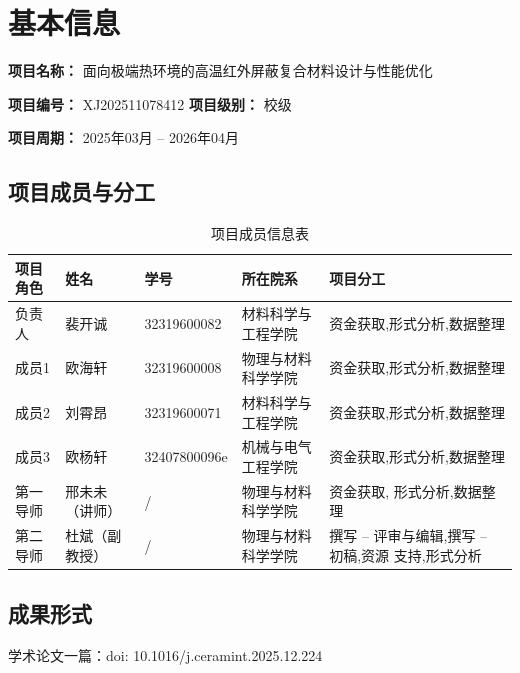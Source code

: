 \chapter{基本信息}

\noindent\textbf{项目名称：} 面向极端热环境的高温红外屏蔽复合材料设计与性能优化

\noindent\textbf{项目编号：} XJ202511078412\hfill
\textbf{项目级别：} 校级

\noindent\textbf{项目周期：} 2025年03月 -- 2026年04月

\section{项目成员与分工}
\begin{table}[H]
\centering
\caption{项目成员信息表}
\begin{tabularx}{\textwidth}{C{2.2cm}C{2.5cm}C{2.5cm}C{3cm}Y}
\toprule
项目角色 & 姓名 & 学号 & 所在院系 & 项目分工 \\
\midrule
负责人 & 裴开诚 & 32319600082 & 材料科学与工程学院 & 资金获取,形式分析,数据整理 \\
成员1 & 欧海轩 & 32319600008 & 物理与材料科学学院 & 资金获取,形式分析,数据整理 \\
成员2 & 刘霄昂 & 32319600071 & 材料科学与工程学院 & 资金获取,形式分析,数据整理 \\
成员3 & 欧杨轩 & 32407800096e & 机械与电气工程学院 & 资金获取,形式分析,数据整理 \\
第一导师 & 邢未未（讲师） & / & 物理与材料科学学院 & 资金获取, 形式分析,数据整理 \\
第二导师 & 杜斌（副教授） & / & 物理与材料科学学院 & 撰写 – 评审与编辑,撰写 – 初稿,资源 支持,形式分析 \\
\bottomrule
\end{tabularx}
\end{table}

\section{成果形式}
学术论文一篇：doi: 10.1016/j.ceramint.2025.12.224
